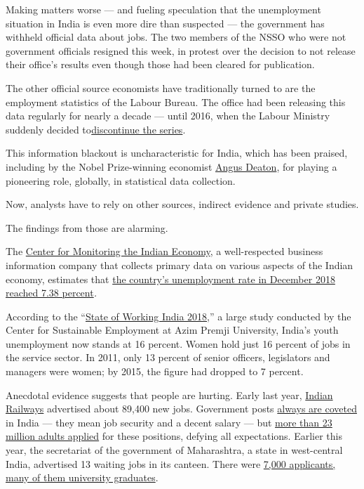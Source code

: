 Making matters worse --- and fueling speculation that the unemployment
situation in India is even more dire than suspected --- the government
has withheld official data about jobs. The two members of the NSSO who
were not government officials resigned this week, in protest over the
decision to not release their office's results even though those had
been cleared for publication.

The other official source economists have traditionally turned to are
the employment statistics of the Labour Bureau. The office had been
releasing this data regularly for nearly a decade --- until 2016, when
the Labour Ministry suddenly decided
to\href{https://www.dnaindia.com/india/report-survey-discontinued-centre-clueless-about-unemployment-2591121}{discontinue
the series}.

This information blackout is uncharacteristic for India, which has been
praised, including by the Nobel Prize-winning economist
\href{https://siteresources.worldbank.org/INTPA/Resources/deaton_kozel_2004.pdf}{Angus
Deaton}, for playing a pioneering role, globally, in statistical data
collection.

Now, analysts have to rely on other sources, indirect evidence and
private studies.

The findings from those are alarming.

The
\href{https://www.cmie.com/kommon/bin/sr.php?kall=warticle\&dt=2018-07-17\%2009:45:21\&msec=123}{Center
for Monitoring the Indian Economy}, a well-respected business
information company that collects primary data on various aspects of the
Indian economy, estimates that
\href{https://unemploymentinindia.cmie.com/}{the country's unemployment
rate in December 2018 reached 7.38 percent}\emph{.}

According to the
``\href{https://cse.azimpremjiuniversity.edu.in/wp-content/uploads/2018/12/State_of_Working_India_2018.pdf}{State
of Working India 2018},'' a large study conducted by the Center for
Sustainable Employment at Azim Premji University, India's youth
unemployment now stands at 16 percent. Women hold just 16 percent of
jobs in the service sector. In 2011, only 13 percent of senior officers,
legislators and managers were women; by 2015, the figure had dropped to
7 percent.

Anecdotal evidence suggests that people are hurting. Early last year,
\href{http://www.indianrailways.gov.in/railwayboard/view_section.jsp?lang=0\&id=0,4,1244}{Indian
Railways} advertised about 89,400 new jobs. Government posts
\href{http://www.bbc.com/capital/story/20180601-the-jobs-in-india-that-attract-millions-of-applicants}{always
are coveted} in India --- they mean job security and a decent salary ---
but
\href{https://timesofindia.indiatimes.com/business/india-business/railways-receives-2-3-crore-applications-for-90000-advertised-jobs/articleshow/63898755.cms}{more
than 23 million adults applied} for these positions, defying all
expectations. Earlier this year, the secretariat of the government of
Maharashtra, a state in west-central India, advertised 13 waiting jobs
in its canteen. There were
\href{https://www.ndtv.com/india-news/graduates-among-7-000-who-apply-for-13-waiter-jobs-at-maharashtra-secretariat-1981639}{7,000
applicants, many of them university graduates}.

